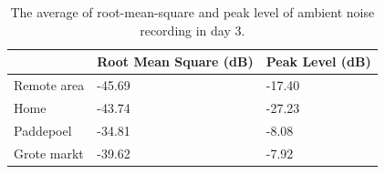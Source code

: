 \begin{table}[H]
\centering
\caption{The average of root-mean-square and peak level of ambient noise recording in day 3.}
\label{tab:ambient-noise-average-day3}
\begin{tabular}{lll} \toprule
            & Root Mean Square (dB) & Peak Level (dB) \\ \midrule
Remote area & -45.69                & -17.40          \\
Home        & -43.74                & -27.23           \\
Paddepoel   & -34.81                & -8.08          \\
Grote markt & -39.62              & -7.92        \\ \bottomrule
\end{tabular}
\end{table}

